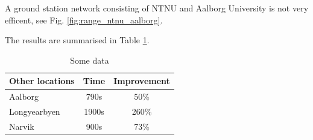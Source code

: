 A ground station network consisting of NTNU and Aalborg University is not very efficent, see Fig. \ref{fig:range_ntnu_aalborg}. 
 


The results are summarised in Table \ref{tab:networks}.

\begin{table}
\begin{center}
\begin{tabular}{l | c c}
  Other locations & Time & Improvement \\
\hline \hline
  Aalborg & 790s &  50\% \\
\hline
  Longyearbyen & 1900s & 260\% \\
\hline
  Narvik & 900s & 73\%  \\
\end{tabular}
\end{center}
\caption{Some data}
\label{tab:networks}
\end{table}